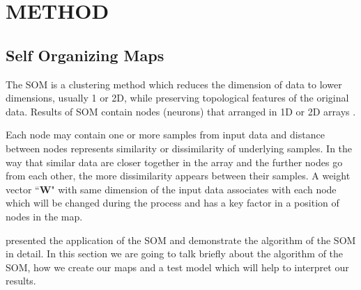 \documentclass[useAMS,usenatbib]{mn2e}
\newcommand{\boldit}[1]{\textbf{\mathversion{bold}#1}}
\begin{document}


\section{METHOD}
\label{sec: method}
 \subsection{Self Organizing Maps}
 \label{sec: som}
 
 The SOM is a clustering method which reduces the dimension of data to lower dimensions, usually 1 or 2D, while preserving topological features of the original data.
 Results of SOM contain nodes (neurons) that arranged in 1D or 2D arrays \citep{Kohonen98}. 
 
 Each node may contain one or more samples from input data and distance between nodes represents similarity or dissimilarity of underlying samples. 
 In the way that similar data are closer together in the array and the further nodes go from each other, the more dissimilarity appears between their samples.
 A weight vector ``\boldit{W}" with same dimension of the input data associates with each node which will be changed during the process and has a key factor in a position of nodes in the map.
 
 \cite{Geach12} presented the application of the SOM and demonstrate the algorithm of the SOM in detail. In this section we are going to talk briefly about the algorithm of the SOM, how we create our maps and a test model which will help to interpret our results. 
\end{document}
